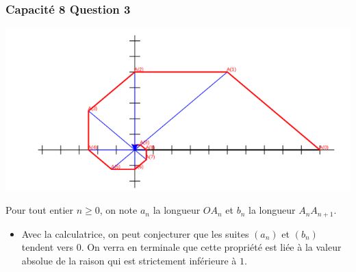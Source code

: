\documentclass[11pt, hyperref={urlcolor=red,%
            linkcolor=blue, %
            colorlinks=true}]{beamer}
\begin{document}
\begin{frame}
\frametitle{Capacité 8 Question 3}


\begin{center}
\includegraphics[scale=0.2]{images/capacite8.png}
\end{center}



Pour tout entier $n\geqslant 0$, on note $a_{n}$ la longueur $OA_{n}$ et $b_{n}$ la longueur $A_{n}A_{n+1}$.


\begin{itemize}

	
\pause \item Avec la calculatrice, on peut conjecturer que les suites $(a_{n})$  et $(b_{n})$ tendent vers $0$. On verra en terminale que cette propriété est liée à la valeur absolue de la raison qui est strictement inférieure à $1$. 

\end{itemize}


\end{frame}
\end{document}
